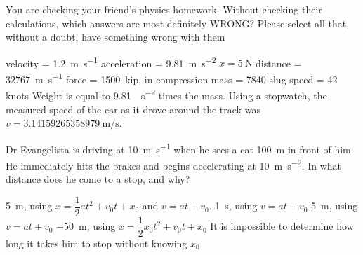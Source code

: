 \documentclass[exam,addpoints, noanswers]{exam}
\begin{document}
\begin{questions}
\clearpage
\question[5] You are checking your friend's physics homework. Without checking their calculations, which answers are most definitely WRONG? Please select all that, without a doubt, have something wrong with them
\begin{choices}
\CorrectChoice velocity = \SI{1.2}{\meter\per\second} 
\CorrectChoice acceleration = \SI{9.81}{\meter\per\second\squared} 
\CorrectChoice $x = \SI{5}{\newton}$ 
\CorrectChoice distance = \SI{32767}{\meter\per\second}
\choice force = \SI{1500}{kip}, in compression
\choice mass = \num{7840} slug
\choice speed = \num{42} knots
\CorrectChoice Weight is equal to \SI{9.81}{\foot\per\second\squared} times the mass. 
\CorrectChoice Using a stopwatch, the measured speed of the car as it drove around the track was $v=\SI{3.14159265358979}{\meter\per\second}$. 
\end{choices}




\question[5] Dr Evangelista is driving at \SI{10}{\meter\per\second} when he sees a cat \SI{100}{\meter} in front of him. He immediately hits the brakes and begins decelerating at \SI{10}{\meter\per\second\squared}. In what distance does he come to a stop, and why? 
\begin{choices}
\CorrectChoice \SI{5}{\meter}, using $x = \dfrac{1}{2} a t^2 + v_0 t + x_0$ and $v = a t + v_0$. 
\choice \SI{1}{\second}, using $v = a t + v_0$
\choice \SI{5}{\meter}, using $v=a t + v_0$
\choice \SI{-50}{\meter}, using $x = \dfrac{1}{2} x_0 t^2 + v_0 t + x_0$
\choice It is impossible to determine how long it takes him to stop without knowing $x_0$
\end{choices}




\end{questions}
\end{document}
